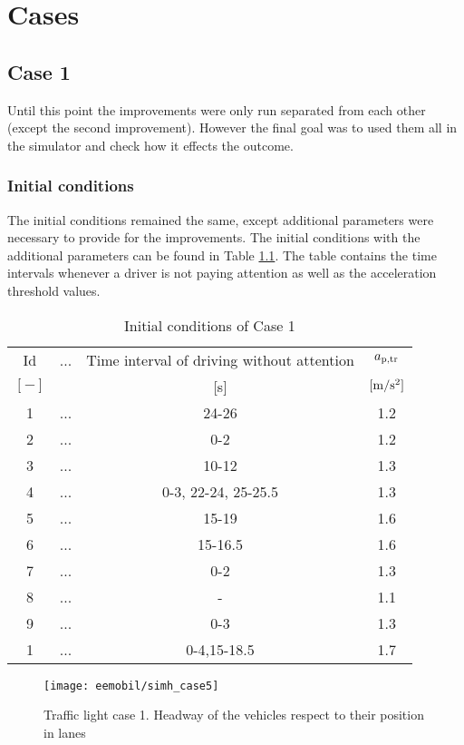 \chapter{Cases}
		\section{Case 1}
			Until this point the improvements were only run separated from each other (except the second improvement). However the final goal was to used them all in the simulator and check how it effects the outcome.
			\subsection*{Initial conditions}
			The initial conditions remained the same, except additional parameters were necessary to provide for the improvements. The initial conditions with the additional parameters can be found in Table \ref{tab:new_array}. The table contains the time intervals whenever a driver is not paying attention as well as the acceleration threshold values.
			\begin{table}
				\begin{center}
					\begin{tabular}{ |c|c|c|c| }
						\hline
						Id & ... & Time interval of driving without attention & $a_{\rm p,tr}$\\
						$[-]$ & & [s]& $\rm [m/s^2]$\\
						\hline
						1 & ... & 24-26 & 1.2 \\
						2 & ... & 0-2 & 1.2 \\
						3 & ... & 10-12 & 1.3 \\
						4 & ... & 0-3, 22-24, 25-25.5 & 1.3 \\
						5 & ... & 15-19 & 1.6 \\
						6 & ... & 15-16.5 & 1.6 \\
						7 & ... & 0-2 & 1.3 \\
						8 & ... & - & 1.1 \\
						9 & ... & 0-3 & 1.3 \\
						1 & ... & 0-4,15-18.5 & 1.7 \\
						\hline
					\end{tabular}
				\end{center}
				\caption{Initial conditions of Case 1}
				\label{tab:new_array}
			\end{table}
			\begin{figure}
				\centering
				\texttt{[image: eemobil/simh\_case5]}
				\caption{Traffic light case 1. Headway of the vehicles respect to their position in lanes}
				\label{fig:red_light_situationh2}
			\end{figure}
